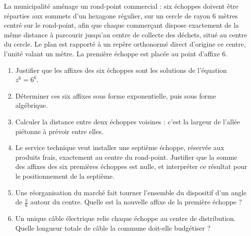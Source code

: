 \begin{jecherche}
La municipalité aménage un rond-point commercial : six échoppes doivent être
réparties aux sommets d'un hexagone régulier, sur un cercle de rayon
$6$ mètres centré sur le rond-point, afin que chaque commerçant dispose
exactement de la même distance à parcourir jusqu'au centre de collecte des
déchets, situé au centre du cercle. Le plan est rapporté à un repère
orthonormé direct d'origine ce centre, l'unité valant un mètre. La première
échoppe est placée au point d'affixe $6$.

\begin{enumerate}[label=\textbf{\arabic*.}, leftmargin=*, itemsep=0.3em]
  \item Justifier que les affixes des six échoppes sont les solutions de
        l'équation $z^{6} = 6^{6}$.
  \item Déterminer ces six affixes sous forme exponentielle, puis sous forme
        algébrique.
  \item Calculer la distance entre deux échoppes voisines : c'est la largeur
        de l'allée piétonne à prévoir entre elles.
  \item Le service technique veut installer une septième échoppe, réservée
        aux produits frais, exactement au centre du rond-point. Justifier
        que la somme des affixes des six premières échoppes est nulle, et
        interpréter ce résultat pour le positionnement de la septième.
  \item Une réorganisation du marché fait tourner l'ensemble du dispositif
        d'un angle de $\frac{\pi}{6}$ autour du centre. Quelle est la
        nouvelle affixe de la première échoppe ?
  \item Un unique câble électrique relie chaque échoppe au centre de
        distribution. Quelle longueur totale de câble la commune doit-elle
        budgétiser ?
\end{enumerate}
\end{jecherche}

